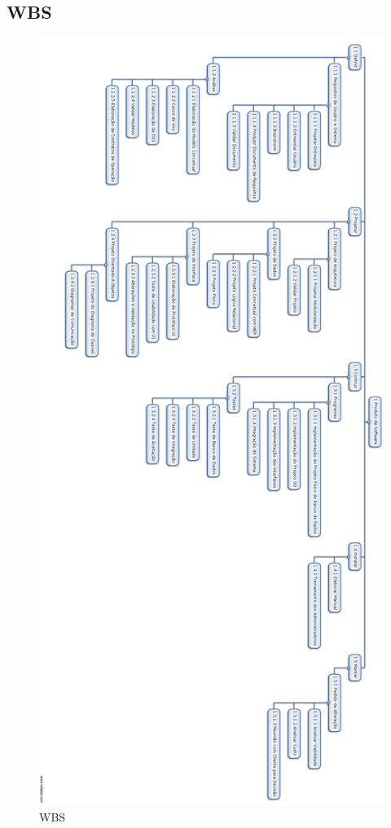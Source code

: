 \documentclass[a4paper,11pt]{article}
\begin{document}
	\subsection{WBS}
	\begin{figure}[!Htb]
    	\centering
        \includegraphics[height=\textheight]{WBS.png}
        \caption{WBS}
     	\label{WBS}
    \end{figure}
\end{document}
